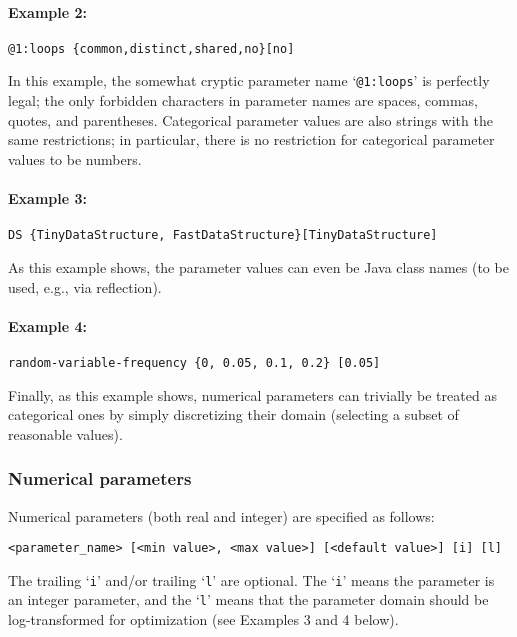 \documentclass[manual.tex]{subfiles}
\begin{document}
\paragraph{Example 2:}
\begin{verbatim}
@1:loops {common,distinct,shared,no}[no]
\end{verbatim}
In this example, the somewhat cryptic parameter name `\texttt{@1:loops}' is perfectly legal; the only forbidden characters in parameter names are spaces, commas, quotes, and parentheses.
%
Categorical parameter values are also strings with the same restrictions; in particular, there is no restriction for categorical parameter values to be numbers. 

\paragraph{Example 3:}
\begin{verbatim}
DS {TinyDataStructure, FastDataStructure}[TinyDataStructure]
\end{verbatim}
As this example shows, the parameter values can even be Java class names (to be used, e.g., via reflection).

\paragraph{Example 4:}
\begin{verbatim}
random-variable-frequency {0, 0.05, 0.1, 0.2} [0.05]
\end{verbatim}
Finally, as this example shows, numerical parameters can trivially be treated as categorical ones by simply discretizing their domain (selecting a subset of reasonable values).

\subsubsection{Numerical parameters} \label{sec:numerical-params}
Numerical parameters (both real and integer) are specified as follows:

\begin{verbatim}
<parameter_name> [<min value>, <max value>] [<default value>] [i] [l]
\end{verbatim}
The trailing `\texttt{i}' and/or trailing `\texttt{l}' are optional. The `\texttt{i}' means the parameter is an integer parameter,
and the `\texttt{l}' means that the parameter domain should be log-transformed for optimization (see Examples 3 and 4 below).
\end{document}

